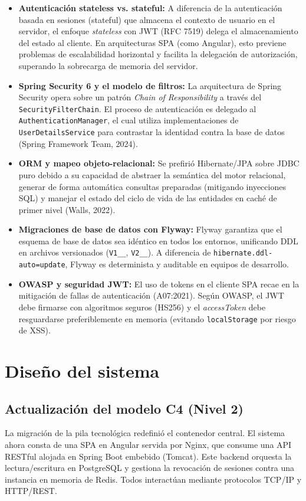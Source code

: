 \documentclass[12pt]{article}
\begin{document}
\begin{itemize}
    \item \textbf{Autenticación stateless vs. stateful:} A diferencia de la autenticación basada en sesiones (stateful) que almacena el contexto de usuario en el servidor, el enfoque \textit{stateless} con JWT (RFC 7519) delega el almacenamiento del estado al cliente. En arquitecturas SPA (como Angular), esto previene problemas de escalabilidad horizontal y facilita la delegación de autorización, superando la sobrecarga de memoria del servidor.
    \item \textbf{Spring Security 6 y el modelo de filtros:} La arquitectura de Spring Security opera sobre un patrón \textit{Chain of Responsibility} a través del \texttt{SecurityFilterChain}. El proceso de autenticación es delegado al \texttt{AuthenticationManager}, el cual utiliza implementaciones de \texttt{UserDetailsService} para contrastar la identidad contra la base de datos (Spring Framework Team, 2024).
    \item \textbf{ORM y mapeo objeto-relacional:} Se prefirió Hibernate/JPA sobre JDBC puro debido a su capacidad de abstraer la semántica del motor relacional, generar de forma automática consultas preparadas (mitigando inyecciones SQL) y manejar el estado del ciclo de vida de las entidades en caché de primer nivel (Walls, 2022).
    \item \textbf{Migraciones de base de datos con Flyway:} Flyway garantiza que el esquema de base de datos sea idéntico en todos los entornos, unificando DDL en archivos versionados (\texttt{V1\_\_}, \texttt{V2\_\_}). A diferencia de \texttt{hibernate.ddl-auto=update}, Flyway es determinista y auditable en equipos de desarrollo.
    \item \textbf{OWASP y seguridad JWT:} El uso de tokens en el cliente SPA recae en la mitigación de fallas de autenticación (A07:2021). Según OWASP, el JWT debe firmarse con algoritmos seguros (HS256) y el \textit{accessToken} debe resguardarse preferiblemente en memoria (evitando \texttt{localStorage} por riesgo de XSS).
\end{itemize}

\section{Diseño del sistema}
\subsection{Actualización del modelo C4 (Nivel 2)}
La migración de la pila tecnológica redefinió el contenedor central. El sistema ahora consta de una SPA en Angular servida por Nginx, que consume una API RESTful alojada en Spring Boot embebido (Tomcat). Este backend orquesta la lectura/escritura en PostgreSQL y gestiona la revocación de sesiones contra una instancia en memoria de Redis. Todos interactúan mediante protocolos TCP/IP y HTTP/REST.
\end{document}
